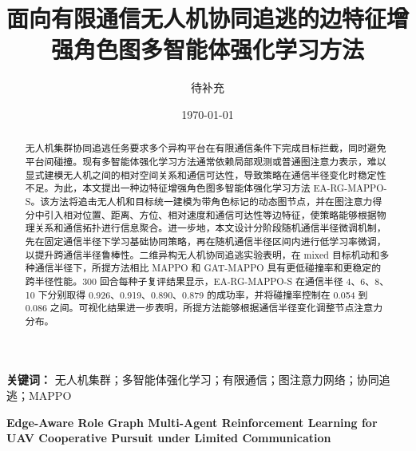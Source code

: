 \documentclass[UTF8,a4paper,11pt]{ctexart}
\title{面向有限通信无人机协同追逃的边特征增强角色图多智能体强化学习方法}
\author{待补充}
\date{\today}
\begin{document}
\maketitle

\begin{abstract}
无人机集群协同追逃任务要求多个异构平台在有限通信条件下完成目标拦截，同时避免平台间碰撞。现有多智能体强化学习方法通常依赖局部观测或普通图注意力表示，难以显式建模无人机之间的相对空间关系和通信可达性，导致策略在通信半径变化时稳定性不足。为此，本文提出一种边特征增强角色图多智能体强化学习方法 EA-RG-MAPPO-S。该方法将追击无人机和目标统一建模为带角色标记的动态图节点，并在图注意力得分中引入相对位置、距离、方位、相对速度和通信可达性等边特征，使策略能够根据物理关系和通信拓扑进行信息聚合。进一步地，本文设计分阶段随机通信半径微调机制，先在固定通信半径下学习基础协同策略，再在随机通信半径区间内进行低学习率微调，以提升跨通信半径鲁棒性。二维异构无人机协同追逃实验表明，在 mixed 目标机动和多种通信半径下，所提方法相比 MAPPO 和 GAT-MAPPO 具有更低碰撞率和更稳定的跨半径性能。300 回合每种子复评结果显示，EA-RG-MAPPO-S 在通信半径 4、6、8、10 下分别取得 0.926、0.919、0.890、0.879 的成功率，并将碰撞率控制在 0.054 到 0.086 之间。可视化结果进一步表明，所提方法能够根据通信半径变化调整节点注意力分布。
\end{abstract}

\noindent\textbf{关键词：} 无人机集群；多智能体强化学习；有限通信；图注意力网络；协同追逃；MAPPO

\vspace{0.8em}
\begin{center}
\textbf{Edge-Aware Role Graph Multi-Agent Reinforcement Learning for UAV Cooperative Pursuit under Limited Communication}
\end{center}
\end{document}
